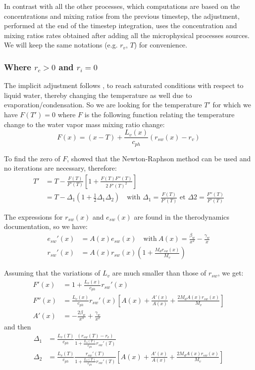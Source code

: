 {In contrast with all the other processes, which computations are based on the concentrations and mixing ratios from the previous timestep, the adjustment, performed at the end of the timestep integration, uses the concentration and mixing ratios rates obtained after adding all the microphysical processes sources. We will keep the same notations (e.g. $r_v$, $T$) for convenience.

\subsubsection{Where $r_c>0$ and $r_i=0$}

The implicit adjustment follows \citet{Langlois1973}, to reach saturated conditions with respect to liquid water, thereby changing the temperature as well due to evaporation/condensation. So we are looking for the temperature $T'$ for which we have $F(T')=0$ where $F$ is the following function relating the temperature change to the water vapor mass mixing ratio change:
\begin{equation}
 F(x) = (x-T) + \frac{L_v(x)}{c_{ph}} (r_{sw}(x)-r_v)
\end{equation}

To find the zero of $F$, \citet{Langlois1973} showed that the Newton-Raphson method can be used and no iterations are necessary, therefore:
\begin{align}
 T' &= T - \frac{F(T)}{F'(T)} [1 + \frac{F(T) F''(T)}{2 ~ F'(T)^2} ] \\
 &= T - \Delta_1 \left( 1 + \frac{1}{2} \Delta_1 \Delta_2 \right) \quad \text{with } \Delta_1 = \frac{F(T)}{F'(T)} \text{ et } \Delta2 = \frac{F''(T)}{F'(T)}
\end{align}

The expressions for $r_{sw}(x)$ and $e_{sw}(x)$ are found in the therodynamics documentation, so we have:
\begin{align}
 e_{sw}'(x) &= A(x) e_{sw}(x) \quad \mathrm{with~} A(x) = \frac{\beta_w}{x^2} - \frac{\gamma_w}{x} \\
 r_{sw}'(x) &= A(x) r_{sw}(x) (1 + \frac{M_d r_{sw}(x)}{M_v} )
\end{align}

Assuming that the variations of $L_v$ are much smaller than those of $r_{sw}$, we get:
\begin{align}
 F'(x) &= 1 + \frac{L_v(x)}{c_{ph}} r_{sw}'(x) \\
 F''(x) &= \frac{L_v(x)}{c_{ph}} r_{sw}'(x) \left[ A(x) + \frac{A'(x)}{A(x)} + \frac{2 M_d A(x) r_{sw}(x)}{M_v} \right] \\
 A'(x) &= - \frac{2 \beta_w}{x^3} + \frac{\gamma_w}{x^2}
\end{align}
and then
\begin{align}
 \Delta_1 &= \frac{L_v(T)}{c_{ph}} \frac{(r_{sw}(T)-r_v)}{1 + \frac{L_v(T)}{c_{ph}} r_{sw}'(T)} \\
 \Delta_2 &= \frac{L_v(T)}{c_{ph}} \frac{r_{sw}'(T)}{1 + \frac{L_v(T)}{c_{ph}} r_{sw}'(T)} \left[ A(x) + \frac{A'(x)}{A(x)} + \frac{2 M_d A(x) r_{sw}(x)}{M_v} \right]
\end{align}

}
